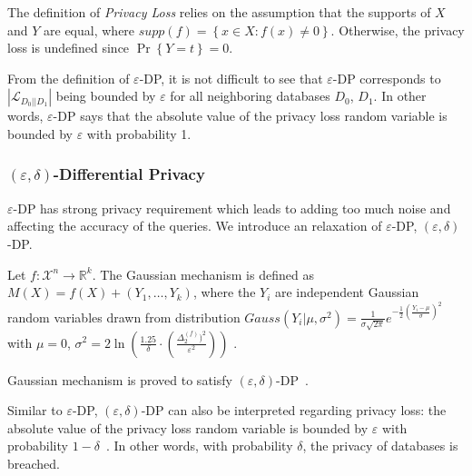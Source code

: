 The definition of \emph{Privacy Loss} relies on the assumption that the supports of $X$ and $Y$ are equal, where $supp\left(f\right)=\left\{x \in X: f\left(x\right) \neq 0\right\}$. Otherwise, the privacy loss is undefined since $\Pr\left\{Y=t\right\}=0$.

From the definition of $\varepsilon$-DP, it is not difficult to see that $\varepsilon$-DP corresponds to $\left|\mathcal{L}_{D_{0}||D_{1}}\right|$ being bounded by $\varepsilon$ for all neighboring databases $D_{0}$, $D_{1}$. In other words, $\varepsilon$-DP says that the absolute value of the privacy loss random variable is bounded by $\varepsilon$ with probability 1.

\subsubsection{$\left(\varepsilon,\delta\right)$-Differential Privacy}
$\varepsilon$-DP has strong privacy requirement which leads to adding too much noise and affecting the accuracy of the queries. We introduce an relaxation of $\varepsilon$-DP, $\left(\varepsilon,\delta\right)$-DP.

\begin{definition}
    Let $f : \mathcal{X}^{n} \rightarrow \mathbb{R}^{k}$. The Gaussian mechanism is defined as $M\left( X\right) =f\left( X\right) +\left( Y_{1},\ldots ,Y_{k}\right) $, where the $Y_{i}$ are independent Gaussian random variables drawn from distribution $Gauss \left(  Y_{i}| \mu ,\sigma ^{2}\right) =\frac{1}{\sigma \sqrt{2\pi }}e^{-\frac{1}{2}\left( \frac{Y_{i}-\mu}{\sigma }\right) ^{2}}$ with  $\mu=0$, $\sigma ^{2}=2\ln \left( \frac{1.25}{\delta }\cdot \left( \frac{ \Delta _{2}^{\left(f\right)}) ^{2}}{\varepsilon ^{2}}\right) \right)$ .
    \label{def:gaussianMechanism}
\end{definition}

Gaussian mechanism is proved to satisfy $\left(\varepsilon,\delta\right)$-DP~\cite{dwork2014algorithmic}.

Similar to $\varepsilon$-DP, $\left(\varepsilon,\delta\right)$-DP can also be interpreted regarding privacy loss: the absolute value of the privacy loss random variable is bounded by $\varepsilon$ with probability $1 - \delta$~\cite[Lemma 3.17]{dwork2014algorithmic}. In other words, with probability $ \delta$, the privacy of databases is breached.
